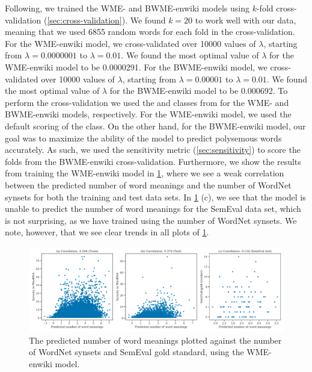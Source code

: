 Following, we trained the WME- and BWME-enwiki models using $k$-fold cross-validation (\cref{sec:cross-validation}). We found $k=20$ to work well with our data, meaning that we used 6855 random words for each fold in the cross-validation. For the WME-enwiki model, we cross-validated over 10000 values of $\lambda$, starting from $\lambda=0.0000001$ to $\lambda=0.01$. We found the most optimal value of $\lambda$ for the WME-enwiki model to be 0.0000291. For the BWME-enwiki model, we cross-validated over 10000 values of $\lambda$, starting from $\lambda=0.00001$ to $\lambda=0.01$. We found the most optimal value of $\lambda$ for the BWME-enwiki model to be 0.000692. To perform the cross-validation we used the  and  classes from  for the WME- and BWME-enwiki models, respectively. For the WME-enwiki model, we used the default scoring of the  class. On the other hand, for the BWME-enwiki model, our goal was to maximize the ability of the model to predict polysemous words accurately. As such, we used the sensitivity metric (\cref{sec:sensitivity}) to score the folds from the BWME-enwiki cross-validation. Furthermore, we show the results from training the WME-enwiki model in \cref{fig:wme-enwiki-correlation-result}, where we see a weak correlation between the predicted number of word meanings and the number of WordNet synsets for both the training and test data sets. In \cref{fig:wme-enwiki-correlation-result} (c), we see that the model is unable to predict the number of word meanings for the SemEval data set, which is not surprising, as we have trained using the number of WordNet synsets. We note, however, that we see clear trends in all plots of \cref{fig:wme-enwiki-correlation-result}.
\begin{figure}[H]
    \centering
    \includegraphics[width=\textwidth]{thesis/figures/wme-enwiki-correlation-result.pdf}
    \caption{The predicted number of word meanings plotted against the number of WordNet synsets and SemEval gold standard, using the WME-enwiki model.}
    \label{fig:wme-enwiki-correlation-result}
\end{figure}

